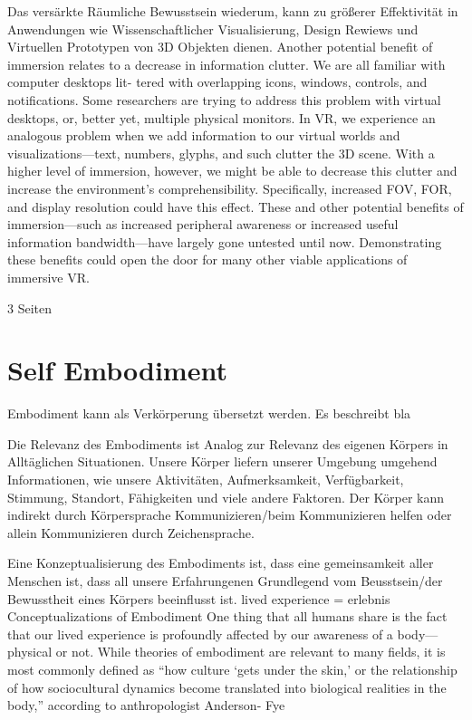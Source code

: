Das versärkte Räumliche Bewusstsein wiederum, kann zu größerer Effektivität in Anwendungen wie Wissenschaftlicher Visualisierung, Design Rewiews und Virtuellen Prototypen von 3D Objekten dienen.
Another potential benefit of immersion relates to a decrease in
information clutter. We are all familiar with computer desktops lit-
tered with overlapping icons, windows, controls, and notifications.
Some researchers are trying to address this problem with virtual
desktops, or, better yet, multiple physical monitors.
In VR, we experience an analogous problem when we add
information to our virtual worlds and visualizations—text,
numbers, glyphs, and such clutter the 3D scene. With a higher
level of immersion, however, we might be able to decrease
this clutter and increase the environment’s comprehensibility.
Specifically, increased FOV, FOR, and display resolution could
have this effect.
These and other potential benefits of immersion—such as
increased peripheral awareness or increased useful information
bandwidth—have largely gone untested until now. Demonstrating
these benefits could open the door for many other viable applications of immersive VR.

3 Seiten


\section{Self Embodiment}
Embodiment kann als Verkörperung übersetzt werden. Es beschreibt bla

Die Relevanz des Embodiments ist Analog zur Relevanz des eigenen Körpers in Alltäglichen Situationen. Unsere Körper liefern unserer Umgebung umgehend Informationen, wie unsere Aktivitäten, Aufmerksamkeit, Verfügbarkeit, Stimmung, Standort, Fähigkeiten und viele andere Faktoren. Der Körper kann indirekt durch Körpersprache Kommunizieren/beim Kommunizieren helfen oder allein Kommunizieren durch Zeichensprache.\cite{Benford2010}

Eine Konzeptualisierung des Embodiments ist, dass eine gemeinsamkeit aller Menschen ist, dass all unsere Erfahrungenen Grundlegend vom Beusstsein/der Bewusstheit eines Körpers beeinflusst ist.
lived experience = erlebnis
Conceptualizations of Embodiment One thing that all humans share is the fact that our lived experience is profoundly affected by our awareness of a body—physical or not. While theories of embodiment are relevant to many fields, it is most commonly defined as “how culture ‘gets under the skin,’ or the relationship of how sociocultural dynamics become translated into biological realities in the body,” according to anthropologist Anderson- Fye

